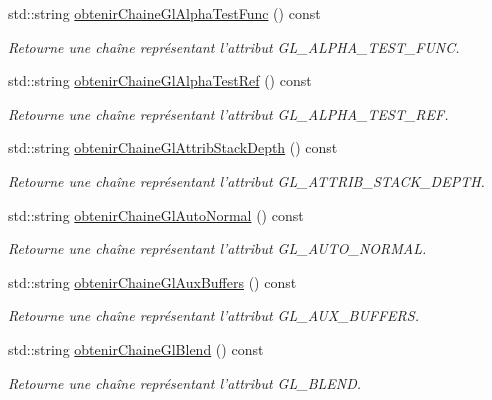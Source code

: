 \begin{DoxyCompactItemize}
std\-::string \hyperlink{group__utilitaire_ga5002fd87fb9aede24afc4c4bb2a61fb1}{obtenir\-Chaine\-Gl\-Alpha\-Test\-Func} () const 
\begin{DoxyCompactList}\small\item\em Retourne une chaîne représentant l'attribut G\-L\-\_\-\-A\-L\-P\-H\-A\-\_\-\-T\-E\-S\-T\-\_\-\-F\-U\-N\-C. \end{DoxyCompactList}\item 
std\-::string \hyperlink{group__utilitaire_gacc2904dcf7edec91f24e5e6ea58a780c}{obtenir\-Chaine\-Gl\-Alpha\-Test\-Ref} () const 
\begin{DoxyCompactList}\small\item\em Retourne une chaîne représentant l'attribut G\-L\-\_\-\-A\-L\-P\-H\-A\-\_\-\-T\-E\-S\-T\-\_\-\-R\-E\-F. \end{DoxyCompactList}\item 
std\-::string \hyperlink{group__utilitaire_ga59c1e206aa477f625b5499cf328f695b}{obtenir\-Chaine\-Gl\-Attrib\-Stack\-Depth} () const 
\begin{DoxyCompactList}\small\item\em Retourne une chaîne représentant l'attribut G\-L\-\_\-\-A\-T\-T\-R\-I\-B\-\_\-\-S\-T\-A\-C\-K\-\_\-\-D\-E\-P\-T\-H. \end{DoxyCompactList}\item 
std\-::string \hyperlink{group__utilitaire_gaaf8d3f8a4dd51812950c32268c8f77c5}{obtenir\-Chaine\-Gl\-Auto\-Normal} () const 
\begin{DoxyCompactList}\small\item\em Retourne une chaîne représentant l'attribut G\-L\-\_\-\-A\-U\-T\-O\-\_\-\-N\-O\-R\-M\-A\-L. \end{DoxyCompactList}\item 
std\-::string \hyperlink{group__utilitaire_gab8c780e176faece6cbaa11084e957e8d}{obtenir\-Chaine\-Gl\-Aux\-Buffers} () const 
\begin{DoxyCompactList}\small\item\em Retourne une chaîne représentant l'attribut G\-L\-\_\-\-A\-U\-X\-\_\-\-B\-U\-F\-F\-E\-R\-S. \end{DoxyCompactList}\item 
std\-::string \hyperlink{group__utilitaire_ga8a5f949f2b7a9a911c0677d639bebae5}{obtenir\-Chaine\-Gl\-Blend} () const 
\begin{DoxyCompactList}\small\item\em Retourne une chaîne représentant l'attribut G\-L\-\_\-\-B\-L\-E\-N\-D. \end{DoxyCompactList}\item 

\end{DoxyCompactItemize}
